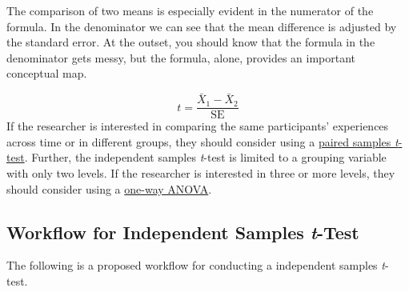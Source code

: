\documentclass[
  11pt,
]{book}
\begin{document}
The comparison of two means is especially evident in the numerator of the formula. In the denominator we can see that the mean difference is adjusted by the standard error. At the outset, you should know that the formula in the denominator gets messy, but the formula, alone, provides an important conceptual map.

\[t = \frac{\bar{X}_1 - \bar{X}_2}{\mbox{SE}}\] If the researcher is interested in comparing the same participants' experiences across time or in different groups, they should consider using a \protect\hyperlink{tPaired}{paired samples \emph{t}-test}. Further, the independent samples \emph{t}-test is limited to a grouping variable with only two levels. If the researcher is interested in three or more levels, they should consider using a \protect\hyperlink{oneway}{one-way ANOVA}.

\hypertarget{workflow-for-independent-samples-t-test}{%
\subsection{\texorpdfstring{Workflow for Independent Samples \emph{t}-Test}{Workflow for Independent Samples t-Test}}\label{workflow-for-independent-samples-t-test}}

The following is a proposed workflow for conducting a independent samples \emph{t}-test.
\end{document}
